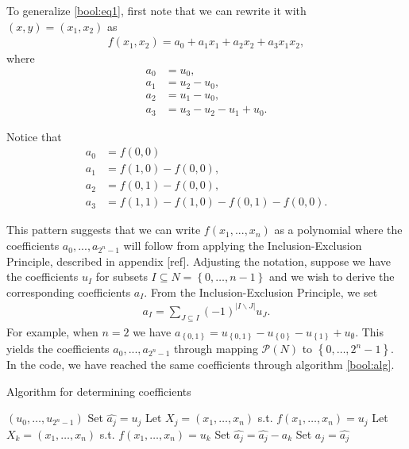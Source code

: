\documentclass{somasmsc}
\begin{document}
To generalize \ref{bool:eq1}, first note that we can rewrite it with $\left(x, y\right) = \left(x_1, x_2\right)$ as
\begin{align*}
f(x_1, x_2) = a_0 + a_1 x_1 + a_2 x_2 + a_3 x_1 x_2,
\end{align*}
where
\begin{align*}
a_0 &= u_0, \\
a_1 &= u_2 - u_0, \\
a_2 &= u_1 - u_0, \\
a_3 &= u_3 - u_2 - u_1 + u_0.
\end{align*}

Notice that
\begin{align*}
a_0 &= f(0, 0) \\
a_1 &= f(1, 0) - f(0, 0), \\
a_2 &= f(0, 1) - f(0, 0), \\
a_3 &= f(1, 1) - f(1, 0) - f(0, 1) - f(0, 0).
\end{align*}

This pattern suggests that we can write $f(x_1, ..., x_n)$ as a polynomial where the coefficients $a_0, ..., a_{2^n-1}$ will follow from applying the Inclusion-Exclusion Principle, described in appendix [ref]. Adjusting the notation, suppose we have the coefficients $u_I$ for subsets $I \subseteq N = \left\{0, \dots, n-1\right\}$ and we wish to derive the corresponding coefficients $a_I$. From the Inclusion-Exclusion Principle, we set
\begin{align*}
    a_I = \sum_{J \subseteq I} \left(-1\right)^{|I \backslash J|} u_J.
\end{align*}
For example, when $n=2$ we have $a_{\left\{0,1\right\}} = u_{\left\{0,1\right\}} - u_{\left\{0\right\}} - u_{\left\{1\right\}} + u_{\emptyset}$. This yields the coefficients $a_0, ..., a_{2^n-1}$ through mapping $\mathcal{P}\left(N\right)$ to $\left\{0, \dots, 2^n-1\right\}$. In the code, we have reached the same coefficients through algorithm \ref{bool:alg}.

\begin{algorithm}
\caption{Algorithm for determining coefficients}\label{bool:alg}
\begin{algorithmic}
\Require $\left(u_0, \dots, u_{2^n-1}\right)$
  \State Set $\hat{a_j} = u_j$
  \State Let $X_j = \left(x_1, \dots, x_n\right)$ s.t. $f(x_1, \dots, x_n) = u_j$
    \State Let $X_k = \left(x_1, \dots, x_n\right)$ s.t. $f(x_1, \dots, x_n) = u_k$
      \State Set $\hat{a_j} = \hat{a_j} - a_k$
    \EndIf
  \EndFor
  \State Set $a_j = \hat{a_j}$
\EndFor
\State {}
\end{algorithmic}
\end{algorithm}
\end{document}
